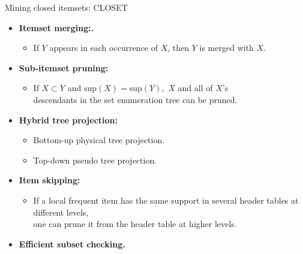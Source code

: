 \documentclass[aspectratio=169,t,xcolor=dvipsnames]{beamer}
\begin{document}
  {
    \begin{frame}{Mining closed itemsets: CLOSET}
        \begin{itemize}
            \item \textbf{Itemset merging:.}
            \begin{itemize}
              \item If $Y$ appears in each occurrence of $X$, then $Y$ is merged with $X$.
            \end{itemize}
            \item \textbf{Sub-itemset pruning:}
            \begin{itemize}
              \item If $X \subset Y$ and $\text{sup}(X) = \text{sup}(Y),$ $X$ and all of $X$'s\\
              descendants in the set enumeration tree can be pruned.
            \end{itemize}
            \item \textbf{Hybrid tree projection:}
            \begin{itemize}
              \item Bottom-up physical tree projection.
              \item Top-down pseudo tree projection.
            \end{itemize}
            \item \textbf{Item skipping:}
            \begin{itemize}
              \item If a local frequent item has the same support in several header tables at different levels, \\
              one can prune it from the header table at higher levels.
            \end{itemize}
            \item \textbf{Efficient subset checking.}
        \end{itemize}
    \end{frame}
  }
\end{document}
